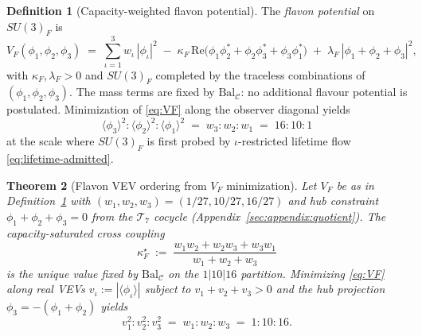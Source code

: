 \documentclass[aps,prd,onecolumn,amsmath,amssymb,nofootinbib,11pt]{revtex4-2}
\numberwithin{equation}{section}
\theoremstyle{plain}
\newtheorem{theorem}{Theorem}[section]
\theoremstyle{definition}
\newtheorem{definition}[theorem]{Definition}
\theoremstyle{remark}
\begin{document}
\begin{definition}[Capacity-weighted flavon potential]\label{def:flavon-potential}
The \emph{flavon potential} on $SU(3)_F$ is
\begin{equation}\label{eq:VF}
  V_F(\phi_1,\phi_2,\phi_3)
  \;=\;
  \sum_{\iota=1}^3 w_\iota\,|\phi_\iota|^2
  \;-\;
  \kappa_F\,\mathrm{Re}\!\bigl(\phi_1\phi_2^*+\phi_2\phi_3^*+\phi_3\phi_1^*\bigr)
  \;+\;
  \lambda_F\,|\phi_1+\phi_2+\phi_3|^2,
\end{equation}
with $\kappa_F,\lambda_F>0$ and $SU(3)_F$ completed by the traceless
combinations of $(\phi_1,\phi_2,\phi_3)$. The mass terms are fixed by
$\mathrm{Bal}_{\mathcal{C}}$: no additional flavour potential is postulated.
Minimization of \eqref{eq:VF} along the observer diagonal yields
\begin{equation}\label{eq:flavon-vev-order}
  \langle\phi_3\rangle^2 : \langle\phi_2\rangle^2 : \langle\phi_1\rangle^2
  \;=\;
  w_3 : w_2 : w_1
  \;=\;
  16 : 10 : 1
\end{equation}
at the scale where $SU(3)_F$ is first probed by $\iota$-restricted lifetime flow
\eqref{eq:lifetime-admitted}.
\end{definition}

\begin{theorem}[Flavon VEV ordering from $V_F$ minimization]
\label{thm:flavon-vev}%
Let $V_F$ be as in Definition~\ref{def:flavon-potential} with
$(w_1,w_2,w_3)=(1/27,10/27,16/27)$ and hub constraint
$\phi_1+\phi_2+\phi_3=0$ from the $\mathcal{T}_7$ cocycle
(Appendix~\ref{sec:appendix:quotient}). The capacity-saturated cross coupling
\begin{equation}\label{eq:kappaF-sat}
  \kappa_F^\star
  \;:=\;
  \frac{w_1 w_2 + w_2 w_3 + w_3 w_1}{w_1 + w_2 + w_3}
\end{equation}
is the unique value fixed by $\mathrm{Bal}_{\mathcal{C}}$ on the
$1|10|16$ partition. Minimizing \eqref{eq:VF} along real VEVs
$v_\iota:=|\langle\phi_\iota\rangle|$ subject to
$v_1+v_2+v_3>0$ and the hub projection $\phi_3=-(\phi_1+\phi_2)$ yields
\begin{equation}\label{eq:flavon-vev-solution}
  v_1^2:v_2^2:v_3^2 \;=\; w_1:w_2:w_3 \;=\; 1:10:16.
\end{equation}
\end{theorem}
\end{document}
